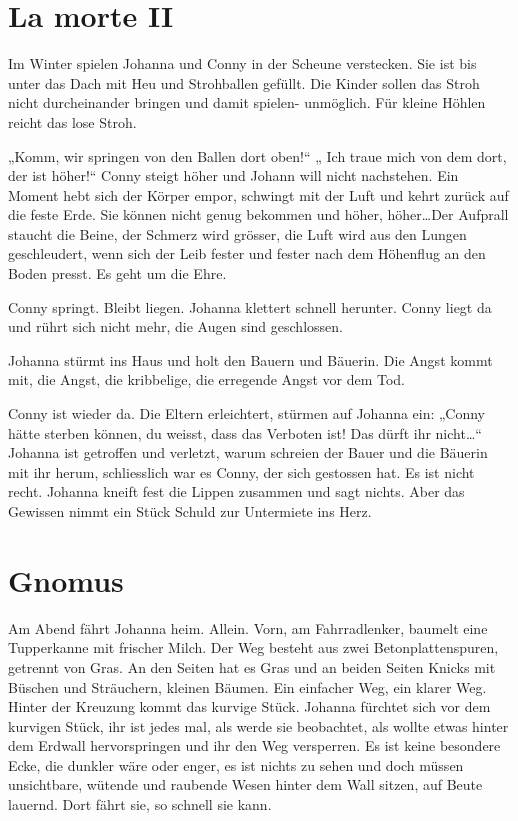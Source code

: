\documentclass[10pt,titlepage,a5paper]{book}
\begin{document}
\section*{La morte II}



Im Winter spielen Johanna und Conny in der Scheune verstecken. Sie ist bis unter das Dach mit Heu und Strohballen gefüllt. Die Kinder sollen das Stroh nicht durcheinander bringen und damit spielen- unmöglich. Für kleine Höhlen reicht das lose Stroh.

„Komm, wir springen von den Ballen dort oben!“ „ Ich traue mich von dem dort, der ist höher!“ Conny steigt höher und Johann will nicht nachstehen. Ein Moment hebt sich der Körper empor, sch\-wingt mit der Luft und kehrt zurück auf die feste Erde. Sie können nicht genug bekommen und höher, höher\dots Der Aufprall staucht die Beine, der Schmerz wird grösser, die Luft wird aus den Lungen geschleudert, wenn sich der Leib fester und fester nach dem Höhenflug an den Boden presst. Es geht um die Ehre.

Conny springt. Bleibt liegen. Johanna klettert schnell herunter. Conny liegt da und rührt sich nicht mehr, die Augen sind geschlossen.

Johanna stürmt ins Haus und holt den Bauern und Bäuerin. Die Angst kommt mit, die Angst, die kribbelige, die erregende Angst vor dem Tod.

Conny ist wieder da. Die Eltern erleichtert, stürmen auf Johanna ein: „Conny hätte sterben können, du weisst, dass das Verboten ist! Das dürft ihr nicht\dots“ Johanna ist getroffen und verletzt, warum schreien der Bauer und die Bäuerin mit ihr herum, schliesslich war es Conny, der sich gestossen hat. Es ist nicht recht. Johanna kneift fest die Lippen zusammen und sagt nichts. Aber das Gewissen nimmt ein Stück Schuld zur Untermiete ins Herz.



\section*{Gnomus}



Am Abend fährt Johanna heim. Allein. Vorn, am Fahrradlenker, baumelt eine Tupperkanne mit frischer Milch. Der Weg besteht aus zwei Betonplattenspuren, getrennt von Gras. An den Seiten hat es Gras und an beiden Seiten Knicks mit Büschen und Sträuchern, kleinen Bäumen. Ein einfacher Weg, ein klarer Weg. Hinter der Kreuzung kommt das kurvige Stück. Johanna fürchtet sich vor dem kurvigen Stück, ihr ist jedes mal, als werde sie beobachtet, als wollte etwas hinter dem Erdwall hervorspringen und ihr den Weg versperren. Es ist keine besondere Ecke, die dunkler wäre oder enger, es ist nichts zu sehen und doch müssen unsichtbare, wütende und raubende Wesen hinter dem Wall sitzen, auf Beute lauernd. Dort fährt sie, so schnell sie kann. 
\end{document}

